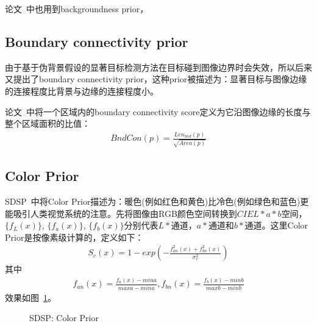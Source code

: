 \documentclass[12pt]{article}
\begin{document}
论文~\cite{jiang2013saliency}中也用到backgroundness prior，

\subsection{Boundary connectivity prior}

由于基于伪背景假设的显著目标检测方法在目标碰到图像边界时会失效，所以后来又提出了boundary connectivity prior，这种prior被描述为：显著目标与图像边缘的连接程度比背景与边缘的连接程度小。

论文~\cite{zhu2014saliency}中将一个区域内的boundary connectivity score定义为它沿图像边缘的长度与整个区域面积的比值：
\begin{align}
BndCon(p) = \frac{Len_{bnd}(p)}{\sqrt{Area(p)}}
\end{align}

\subsection{Color Prior}

SDSP~\cite{zhang2013sdsp}中将Color Prior描述为：暖色(例如红色和黄色)比冷色(例如绿色和蓝色)更能吸引人类视觉系统的注意。先将图像由RGB颜色空间转换到$CIEL*a*b$空间，$\{ f_L(x)\}$, $\{ f_a(x)\}$, $\{ f_b(x)\}$分别代表$L*$通道，$a*$通道和$b*$通道。这里Color Prior是按像素级计算的，定义如下：
\begin{align}
S_c(x) = 1-exp\left(-\frac{f_{an}^2(x)+f_{bn}^2(x)}{\sigma_c^2}\right)
\end{align}
其中
\begin{align}
f_{an}(x)=\frac{f_a(x)-mina}{maxa-mina}, f_{bn}(x) = \frac{f_b(x)-minb}{maxb-minb}
\end{align}
效果如图~\ref{fig: SDSPColorPrior}。
\begin{figure}
  \centering 
  \caption{SDSP: Color Prior}
  \label{fig: SDSPColorPrior} %
\end{figure}
\end{document}
